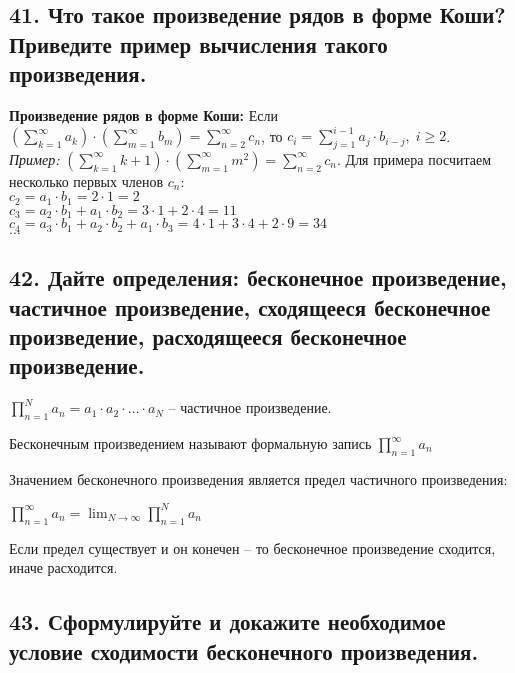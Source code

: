 \documentclass[a4paper, fleqn]{article}
\begin{document}
    \subsection*{41. Что такое произведение рядов в форме Коши? Приведите пример вычисления такого произведения.}
    \textbf{Произведение рядов в форме Коши:} Если $\left(\sum_{k=1}^{\infty} a_k\right) \cdot \left(\sum_{m=1}^{\infty} b_m \right) = \sum_{n=2}^{\infty} c_n$, то $c_i = \sum\limits_{j = 1}^{i - 1} a_j \cdot b_{i - j}, \; i \geq 2$. \\
    \textit{Пример:} $\left(\sum\limits_{k=1}^{\infty} k + 1 \right) \cdot \left( \sum\limits_{m = 1}^{\infty} m^2 \right) = \sum\limits_{n = 2}^{\infty} c_n$. Для примера посчитаем несколько первых членов $c_n$: \\
    $c_2 = a_1 \cdot b_1 = 2 \cdot 1 = 2$\\
    $c_3 = a_2 \cdot b_1 + a_1 \cdot b_2 = 3 \cdot 1 + 2 \cdot 4 = 11$ \\
    $c_4 = a_3 \cdot b_1 + a_2 \cdot b_2 + a_1 \cdot b_3 = 4 \cdot 1 + 3 \cdot 4 + 2 \cdot 9 = 34$ \\
    $\dots$ \\

        
        \subsection*{42. Дайте определения: бесконечное произведение, частичное произведение, сходящееся бесконечное произведение, расходящееся бесконечное произведение.}
 
        $\prod_{n=1}^{N} a_n = a_1 \cdot a_2 \cdot \dots \cdot a_N$ -- частичное произведение.

        Бесконечным произведением называют формальную запись $\prod_{n=1}^{\infty} a_n$

        Значением бесконечного произведения является предел частичного произведения:

        $\prod_{n=1}^{\infty} a_n = \lim_{N \to \infty} \prod_{n=1}^{N} a_n$

        Если предел существует и он конечен -- то бесконечное произведение сходится, иначе расходится.
    
    \subsection*{43. Сформулируйте и докажите необходимое условие сходимости бесконечного произведения.}
\end{document}
